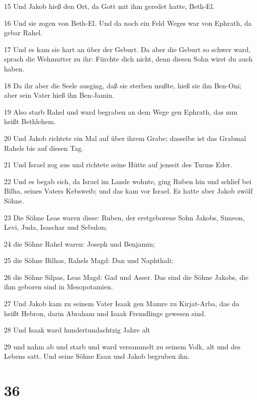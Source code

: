 \par 15 Und Jakob hieß den Ort, da Gott mit ihm geredet hatte, Beth-El.
\par 16 Und sie zogen von Beth-El. Und da noch ein Feld Weges war von Ephrath, da gebar Rahel.
\par 17 Und es kam sie hart an über der Geburt. Da aber die Geburt so schwer ward, sprach die Wehmutter zu ihr: Fürchte dich nicht, denn diesen Sohn wirst du auch haben.
\par 18 Da ihr aber die Seele ausging, daß sie sterben mußte, hieß sie ihn Ben-Oni; aber sein Vater hieß ihn Ben-Jamin.
\par 19 Also starb Rahel und ward begraben an dem Wege gen Ephrath, das nun heißt Bethlehem.
\par 20 Und Jakob richtete ein Mal auf über ihrem Grabe; dasselbe ist das Grabmal Rahels bis auf diesen Tag.
\par 21 Und Israel zog aus und richtete seine Hütte auf jenseit des Turms Eder.
\par 22 Und es begab sich, da Israel im Lande wohnte, ging Ruben hin und schlief bei Bilha, seines Vaters Kebsweib; und das kam vor Israel. Es hatte aber Jakob zwölf Söhne.
\par 23 Die Söhne Leas waren diese: Ruben, der erstgeborene Sohn Jakobs, Simeon, Levi, Juda, Isaschar und Sebulon;
\par 24 die Söhne Rahel waren: Joseph und Benjamin;
\par 25 die Söhne Bilhas, Rahels Magd: Dan und Naphthali;
\par 26 die Söhne Silpas, Leas Magd: Gad und Asser. Das sind die Söhne Jakobs, die ihm geboren sind in Mesopotamien.
\par 27 Und Jakob kam zu seinem Vater Isaak gen Mamre zu Kirjat-Arba, das da heißt Hebron, darin Abraham und Isaak Fremdlinge gewesen sind.
\par 28 Und Isaak ward hundertundachtzig Jahre alt
\par 29 und nahm ab und starb und ward versammelt zu seinem Volk, alt und des Lebens satt. Und seine Söhne Esau und Jakob begruben ihn.

\chapter{36}

